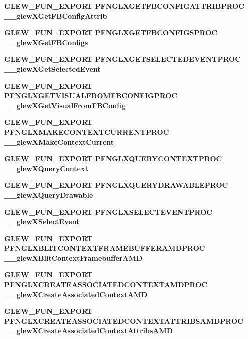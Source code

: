 \begin{DoxyCompactItemize}
\item 
{\bf G\+L\+E\+W\+\_\+\+F\+U\+N\+\_\+\+E\+X\+P\+O\+RT} {\bf P\+F\+N\+G\+L\+X\+G\+E\+T\+F\+B\+C\+O\+N\+F\+I\+G\+A\+T\+T\+R\+I\+B\+P\+R\+OC} {\bf \+\_\+\+\_\+glew\+X\+Get\+F\+B\+Config\+Attrib}
\item 
{\bf G\+L\+E\+W\+\_\+\+F\+U\+N\+\_\+\+E\+X\+P\+O\+RT} {\bf P\+F\+N\+G\+L\+X\+G\+E\+T\+F\+B\+C\+O\+N\+F\+I\+G\+S\+P\+R\+OC} {\bf \+\_\+\+\_\+glew\+X\+Get\+F\+B\+Configs}
\item 
{\bf G\+L\+E\+W\+\_\+\+F\+U\+N\+\_\+\+E\+X\+P\+O\+RT} {\bf P\+F\+N\+G\+L\+X\+G\+E\+T\+S\+E\+L\+E\+C\+T\+E\+D\+E\+V\+E\+N\+T\+P\+R\+OC} {\bf \+\_\+\+\_\+glew\+X\+Get\+Selected\+Event}
\item 
{\bf G\+L\+E\+W\+\_\+\+F\+U\+N\+\_\+\+E\+X\+P\+O\+RT} {\bf P\+F\+N\+G\+L\+X\+G\+E\+T\+V\+I\+S\+U\+A\+L\+F\+R\+O\+M\+F\+B\+C\+O\+N\+F\+I\+G\+P\+R\+OC} {\bf \+\_\+\+\_\+glew\+X\+Get\+Visual\+From\+F\+B\+Config}
\item 
{\bf G\+L\+E\+W\+\_\+\+F\+U\+N\+\_\+\+E\+X\+P\+O\+RT} {\bf P\+F\+N\+G\+L\+X\+M\+A\+K\+E\+C\+O\+N\+T\+E\+X\+T\+C\+U\+R\+R\+E\+N\+T\+P\+R\+OC} {\bf \+\_\+\+\_\+glew\+X\+Make\+Context\+Current}
\item 
{\bf G\+L\+E\+W\+\_\+\+F\+U\+N\+\_\+\+E\+X\+P\+O\+RT} {\bf P\+F\+N\+G\+L\+X\+Q\+U\+E\+R\+Y\+C\+O\+N\+T\+E\+X\+T\+P\+R\+OC} {\bf \+\_\+\+\_\+glew\+X\+Query\+Context}
\item 
{\bf G\+L\+E\+W\+\_\+\+F\+U\+N\+\_\+\+E\+X\+P\+O\+RT} {\bf P\+F\+N\+G\+L\+X\+Q\+U\+E\+R\+Y\+D\+R\+A\+W\+A\+B\+L\+E\+P\+R\+OC} {\bf \+\_\+\+\_\+glew\+X\+Query\+Drawable}
\item 
{\bf G\+L\+E\+W\+\_\+\+F\+U\+N\+\_\+\+E\+X\+P\+O\+RT} {\bf P\+F\+N\+G\+L\+X\+S\+E\+L\+E\+C\+T\+E\+V\+E\+N\+T\+P\+R\+OC} {\bf \+\_\+\+\_\+glew\+X\+Select\+Event}
\item 
{\bf G\+L\+E\+W\+\_\+\+F\+U\+N\+\_\+\+E\+X\+P\+O\+RT} {\bf P\+F\+N\+G\+L\+X\+B\+L\+I\+T\+C\+O\+N\+T\+E\+X\+T\+F\+R\+A\+M\+E\+B\+U\+F\+F\+E\+R\+A\+M\+D\+P\+R\+OC} {\bf \+\_\+\+\_\+glew\+X\+Blit\+Context\+Framebuffer\+A\+MD}
\item 
{\bf G\+L\+E\+W\+\_\+\+F\+U\+N\+\_\+\+E\+X\+P\+O\+RT} {\bf P\+F\+N\+G\+L\+X\+C\+R\+E\+A\+T\+E\+A\+S\+S\+O\+C\+I\+A\+T\+E\+D\+C\+O\+N\+T\+E\+X\+T\+A\+M\+D\+P\+R\+OC} {\bf \+\_\+\+\_\+glew\+X\+Create\+Associated\+Context\+A\+MD}
\item 
{\bf G\+L\+E\+W\+\_\+\+F\+U\+N\+\_\+\+E\+X\+P\+O\+RT} {\bf P\+F\+N\+G\+L\+X\+C\+R\+E\+A\+T\+E\+A\+S\+S\+O\+C\+I\+A\+T\+E\+D\+C\+O\+N\+T\+E\+X\+T\+A\+T\+T\+R\+I\+B\+S\+A\+M\+D\+P\+R\+OC} {\bf \+\_\+\+\_\+glew\+X\+Create\+Associated\+Context\+Attribs\+A\+MD}

\end{DoxyCompactItemize}
